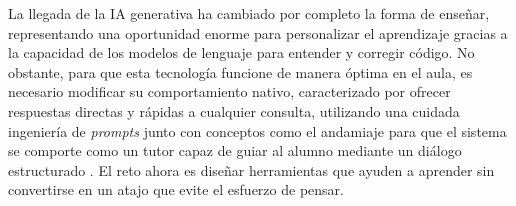 La llegada de la IA generativa ha cambiado por completo la forma de enseñar, representando una oportunidad enorme para personalizar el aprendizaje gracias a la capacidad de los modelos de lenguaje para entender y corregir código. No obstante, para que esta tecnología funcione de manera óptima en el aula, es necesario modificar su comportamiento nativo, caracterizado por ofrecer respuestas directas y rápidas a cualquier consulta, utilizando una cuidada ingeniería de \textit{prompts} junto con conceptos como el andamiaje para que el sistema se comporte como un tutor capaz de guiar al alumno mediante un diálogo estructurado \cite{chang2023prompting, kargupta2024instruct}. El reto ahora es diseñar herramientas que ayuden a aprender sin convertirse en un atajo que evite el esfuerzo de pensar.